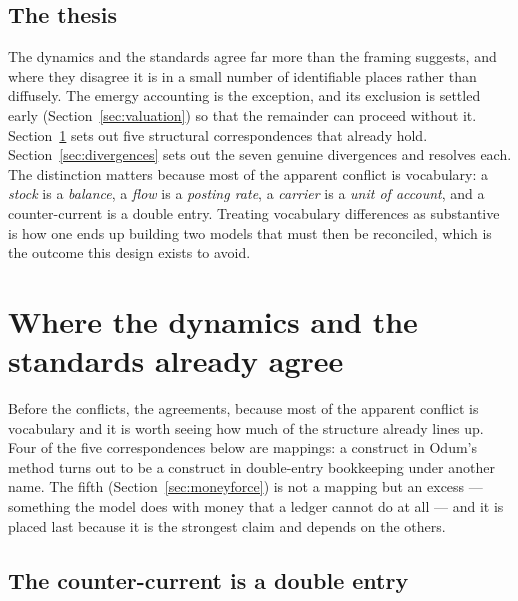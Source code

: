 \documentclass[11pt,a4paper]{article}
\begin{document}
\subsection{The thesis}

The dynamics and the standards agree far more than the framing suggests, and where they disagree it is in a small number of identifiable places rather than diffusely. The emergy accounting is the exception, and its exclusion is settled early (Section~\ref{sec:valuation}) so that the remainder can proceed without it. Section~\ref{sec:agree} sets out five structural correspondences that already hold. Section~\ref{sec:divergences} sets out the seven genuine divergences and resolves each. The distinction matters because most of the apparent conflict is vocabulary: a \emph{stock} is a \emph{balance}, a \emph{flow} is a \emph{posting rate}, a \emph{carrier} is a \emph{unit of account}, and a counter-current is a double entry. Treating vocabulary differences as substantive is how one ends up building two models that must then be reconciled, which is the outcome this design exists to avoid.

\section{Where the dynamics and the standards already agree}
\label{sec:agree}

Before the conflicts, the agreements, because most of the apparent conflict is vocabulary and it is worth seeing how much of the structure already lines up. Four of the five correspondences below are mappings: a construct in Odum's method turns out to be a construct in double-entry bookkeeping under another name. The fifth (Section~\ref{sec:moneyforce}) is not a mapping but an excess --- something the model does with money that a ledger cannot do at all --- and it is placed last because it is the strongest claim and depends on the others.

\subsection{The counter-current is a double entry}
\end{document}
